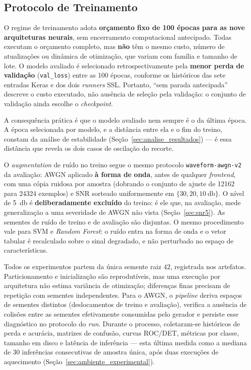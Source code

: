 \documentclass[12pt,a4paper]{article}
\begin{document}
\subsection{Protocolo de Treinamento}
\label{sec:protocolo_treinamento}

O regime de treinamento adota \textbf{orçamento fixo de \num{100} épocas para
as nove arquiteturas neurais}, sem encerramento computacional antecipado. Todas
executam o orçamento completo, mas \textbf{não} têm o mesmo custo, número de
atualizações ou dinâmica de otimização, que variam com família e tamanho de
lote. O modelo avaliado é selecionado retrospectivamente pela \textbf{menor
perda de validação} (\texttt{val\_loss}) entre as \num{100} épocas, conforme os
históricos das sete entradas Keras e dos dois \textit{runners} SSL. Portanto,
``sem parada antecipada'' descreve o custo executado, não ausência de seleção
pela validação: o conjunto de validação ainda escolhe o \textit{checkpoint}.

A consequência prática é que o modelo avaliado nem sempre é o da última época.
A época selecionada por modelo, e a distância entre ela e o fim do treino,
constam da análise de estabilidade (Seção~\ref{sec:analise_resultados}) --- é
essa distância que revela os dois casos de oscilação do recorte.

O \textit{augmentation} de ruído no treino segue o mesmo protocolo
\texttt{waveform-awgn-v2} da avaliação: AWGN aplicado \textbf{à forma de onda},
antes de qualquer \textit{frontend}, com uma cópia ruidosa por amostra
(dobrando o conjunto de ajuste de \num{12162} para \num{24324} exemplos) e SNR
sorteado uniformemente em $\{30, 20, \SI{10}{\decibel}\}$. O nível de
\SI{5}{\decibel} é \textbf{deliberadamente excluído} do treino: é ele que, na
avaliação, mede generalização a uma severidade de AWGN não vista
(Seção~\ref{sec:snr5}). As sementes de ruído de treino e de avaliação são
disjuntas. O mesmo procedimento vale para SVM e \textit{Random Forest}: o ruído
entra na forma de onda e o vetor tabular é recalculado sobre o sinal degradado,
e não perturbado no espaço de características.

Todos os experimentos partem da única semente raiz $42$, registrada nos
artefatos. Particionamento e inicialização são reprodutíveis, mas uma execução
por arquitetura não estima variância de otimização; diferenças finas precisam
de repetição com sementes independentes. Para o AWGN, o
\textit{pipeline} deriva espaços de sementes distintos (deslocamentos de treino
e avaliação), verifica a ausência de colisões entre as sementes efetivamente
consumidas pelo gerador e persiste esse diagnóstico no protocolo do \textit{run}.
Durante o processo, coletaram-se históricos de perda e acurácia, matrizes de
confusão, curvas ROC/DET, métricas por classe, tamanho em
disco e latência de inferência --- esta última medida como a mediana de
\num{30} inferências consecutivas de amostra única, após duas execuções de
aquecimento (Seção~\ref{sec:ambiente_experimental}).
\end{document}
